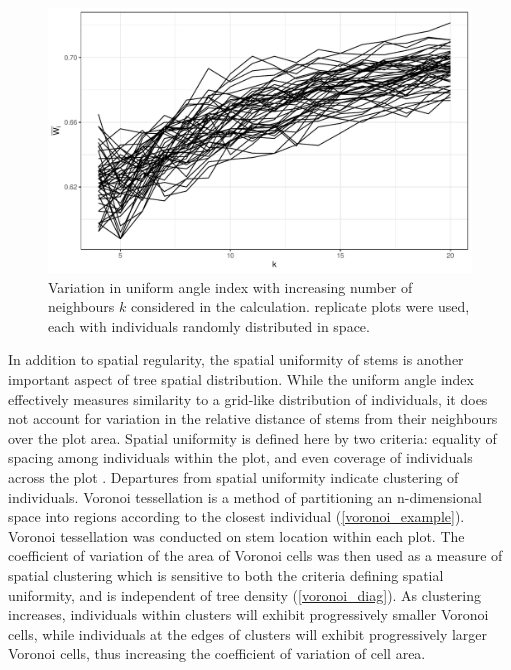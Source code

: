 \documentclass[11pt,a4paper]{article}
\begin{document}
\begin{figure}
\centering
	\includegraphics[width=\linewidth]{wi_k}
	\caption{Variation in uniform angle index with increasing number of neighbours $k$ considered in the calculation. \wikn{} replicate plots were used, each with \wiki{} individuals randomly distributed in space.}
	\label{wi_k}
\end{figure}

In addition to spatial regularity, the spatial uniformity of stems is another important aspect of tree spatial distribution. While the uniform angle index effectively measures similarity to a grid-like distribution of individuals, it does not account for variation in the relative distance of stems from their neighbours over the plot area. Spatial uniformity is defined here by two criteria: equality of spacing among individuals within the plot, and even coverage of individuals across the plot \citep{Ong2012}. Departures from spatial uniformity indicate clustering of individuals. Voronoi tessellation is a method of partitioning an n-dimensional space into regions according to the closest individual (\autoref{voronoi_example}). Voronoi tessellation was conducted on stem location within each plot. The coefficient of variation of the area of Voronoi cells was then used as a measure of spatial clustering which is sensitive to both the criteria defining spatial uniformity, and is independent of tree density (\autoref{voronoi_diag}). As clustering increases, individuals within clusters will exhibit progressively smaller Voronoi cells, while individuals at the edges of clusters will exhibit progressively larger Voronoi cells, thus increasing the coefficient of variation of cell area.
\end{document}
